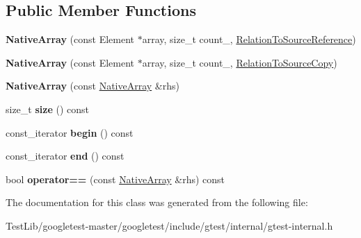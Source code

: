 \subsection*{Public Member Functions}
\begin{DoxyCompactItemize}
\item 
\mbox{\label{classtesting_1_1internal_1_1NativeArray_a52b3689c62532703d11e9d82939a7141}} 
{\bfseries Native\+Array} (const Element $\ast$array, size\+\_\+t count_, \hyperlink{structtesting_1_1internal_1_1RelationToSourceReference}{Relation\+To\+Source\+Reference})
\item 
\mbox{\label{classtesting_1_1internal_1_1NativeArray_ac184ee5741af5be3402213819c834405}} 
{\bfseries Native\+Array} (const Element $\ast$array, size\+\_\+t count_, \hyperlink{structtesting_1_1internal_1_1RelationToSourceCopy}{Relation\+To\+Source\+Copy})
\item 
\mbox{\label{classtesting_1_1internal_1_1NativeArray_abb346ac3040f5da733f594cc2d5958bc}} 
{\bfseries Native\+Array} (const \hyperlink{classtesting_1_1internal_1_1NativeArray}{Native\+Array} \&rhs)
\item 
\mbox{\label{classtesting_1_1internal_1_1NativeArray_af96a4a5ca0cdd5d163c47a081f08bd89}} 
size\+\_\+t {\bfseries size} () const
\item 
\mbox{\label{classtesting_1_1internal_1_1NativeArray_a3046d93cfa23097e7b7c91f5f982dc78}} 
const\+\_\+iterator {\bfseries begin} () const
\item 
\mbox{\label{classtesting_1_1internal_1_1NativeArray_ae1cda748e49c6906421c6183c4d07c5a}} 
const\+\_\+iterator {\bfseries end} () const
\item 
\mbox{\label{classtesting_1_1internal_1_1NativeArray_a81b90f5739ed812610e68dc34c9e3850}} 
bool {\bfseries operator==} (const \hyperlink{classtesting_1_1internal_1_1NativeArray}{Native\+Array} \&rhs) const
\end{DoxyCompactItemize}


The documentation for this class was generated from the following file\+:\begin{DoxyCompactItemize}
\item 
Test\+Lib/googletest-\/master/googletest/include/gtest/internal/gtest-\/internal.\+h\end{DoxyCompactItemize}

